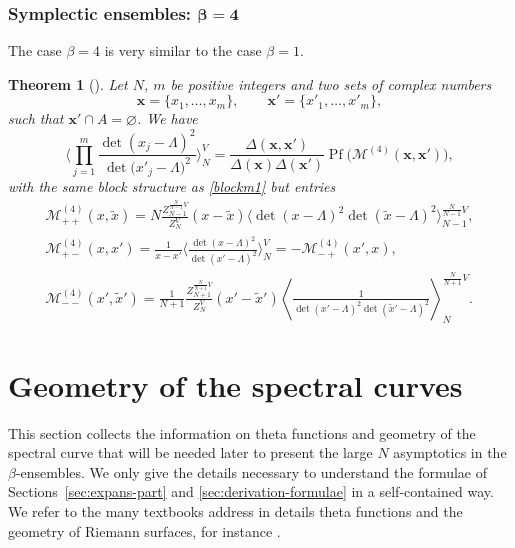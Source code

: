 \documentclass[pdftex]{sigma}
\numberwithin{equation}{section}
\newtheorem{Theorem}{Theorem}[section]
\newcommand{\mean}[1]{\left\langle{#1}\right\rangle}
\DeclareMathOperator{\pf}{Pf}
\begin{document}
\subsubsection[Symplectic ensembles: beta = 4]{Symplectic ensembles: $\boldsymbol{\beta = 4}$}
The case $\beta = 4$ is very similar to the case $\beta = 1$.

\begin{Theorem}[{\cite[Theorem 1.2.1]{borodin_averages}}]
 \label{th:idbeta4} Let $N$, $m$ be positive integers and two sets of complex numbers
\[
\bm{x} = \{x_{1}, \ldots, x_{m}\},\qquad \bm{x}' = \{x'_{1}, \ldots, x'_{m}\},
\]
 such that $\bm{x}' \cap A= \varnothing$. We have
 \begin{equation*}%
 \Biggl\langle\prod_{j=1}^{m}\frac{\det(x_{j} - \Lambda)^{2}}{\det\big(x'_{j} - \Lambda\big)^{2}}\Biggr\rangle_{N}^{V}
 = \frac{\Delta(\bm{x},\bm{x}')}{\Delta(\bm{x})\Delta(\bm{x}')}\pf\bigl(\mathcal{M}^{(4)}(\bm{x},\bm{x}')\bigr),
 \end{equation*}
 with the same block structure as \eqref{blockm1} but entries
 \begin{gather*}%
 \mathcal{M}^{(4)}_{++}(x,\tilde{x}) = N\frac{Z^{\frac{N}{N-1}V}_{N-1}}{Z^{V}_{N}}(x- \tilde{x})\bigl\langle\det(x - \Lambda)^{2}\det(\tilde{x} - \Lambda)^{2}\bigr\rangle^{\frac{N}{N - 1}V}_{N-1},\\
 \mathcal{M}^{(4)}_{+-}(x,x')  = \frac{1}{x-x'}\Biggl\langle\frac{\det(x - \Lambda)^{2}}{\det(x' - \Lambda)^{2}}\Biggr\rangle^{V}_{N} = -\mathcal{M}^{(4)}_{-+}(x',x), \\
 \mathcal{M}^{(4)}_{--}(x',\tilde{x}') = \frac{1}{N+1}\frac{Z^{\frac{N}{N+1}V}_{N+1}}{Z^{V}_{N}}(x'- \tilde{x}')\mean{\frac{1}{\det(x' - \Lambda)^{2}\det(\tilde{x}' - \Lambda)^{2}}}^{\frac{N}{N+1}V}_{N}.
 \end{gather*}
\end{Theorem}

\section{Geometry of the spectral curves}%

This section collects the information on theta functions and geometry of the spectral curve that will be needed later to present the large $N$ asymptotics in the $\beta$-ensembles. We only give the details necessary to understand the formulae of Sections~\ref{sec:expans-part} and \ref{sec:derivation-formulae} in a self-contained way. We refer to the many textbooks address in details theta functions and the geometry of Riemann surfaces, for instance \cite{Bertolac,Farkas-Kra, Fay,Tata1}.
\end{document}
